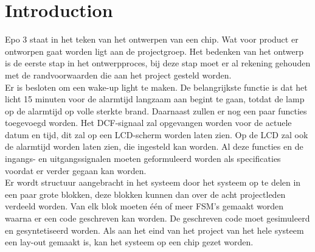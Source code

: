 \chapter{Introduction}
Epo 3 staat in het teken van het ontwerpen van een chip. Wat voor product er ontworpen gaat worden ligt aan de projectgroep. Het bedenken van het ontwerp is de eerste stap in het ontwerpproces, bij deze stap moet er al rekening gehouden met de randvoorwaarden die aan het project gesteld worden.\\
Er is besloten om een wake-up light te maken. De belangrijkste functie is dat het licht 15 minuten voor de alarmtijd langzaam aan begint te gaan, totdat de lamp op de alarmtijd op volle sterkte brand. Daarnaast zullen er nog een paar functies toegevoegd worden. Het DCF-signaal zal opgevangen worden voor de actuele datum en tijd, dit zal op een LCD-scherm worden laten zien. Op de LCD zal ook de alarmtijd worden laten zien, die ingesteld kan worden. Al deze functies en de ingangs- en uitgangssignalen moeten geformuleerd worden als specificaties voordat er verder gegaan kan worden.\\
Er wordt structuur aangebracht in het systeem door het systeem op te delen in een paar grote blokken, deze blokken kunnen dan over de acht projectleden verdeeld worden. Van elk blok moeten \'e\'en of meer FSM's gemaakt worden waarna er een code geschreven kan worden. De geschreven code moet gesimuleerd en gesyntetiseerd worden. Als aan het eind van het project van het hele systeem een lay-out gemaakt is, kan het systeem op een chip gezet worden.

